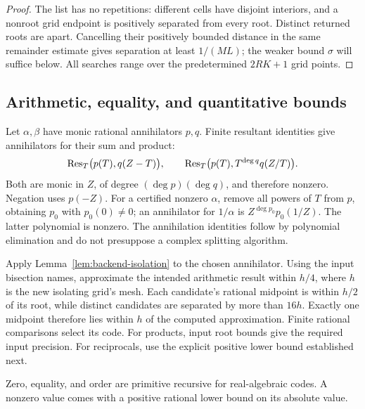 \begin{proof}
The list has no repetitions: different cells have disjoint interiors,
and a nonroot grid endpoint is positively separated from every root.
Distinct returned roots are apart. Cancelling their positively bounded
distance in the same remainder estimate gives separation at least
$1/(ML)$; the weaker bound $\sigma$ will suffice below.
All searches range over the predetermined $2RK+1$ grid points.
\end{proof}

\subsection{Arithmetic, equality, and quantitative bounds}

Let $\alpha,\beta$ have monic rational annihilators $p,q$.
Finite resultant identities give annihilators for their sum and product:
\[
 \operatorname{Res}_T\bigl(p(T),q(Z-T)\bigr),\qquad
 \operatorname{Res}_T\bigl(p(T),T^{\deg q}q(Z/T)\bigr).
\]
Both are monic in $Z$, of degree $(\deg p)(\deg q)$, and therefore nonzero.
Negation uses $p(-Z)$. For a certified nonzero $\alpha$, remove all powers
of $T$ from $p$, obtaining $p_0$ with $p_0(0)\ne0$; an annihilator for
$1/\alpha$ is
$Z^{\deg p_0}p_0(1/Z)$.
The latter polynomial is nonzero. The annihilation identities follow by
polynomial elimination and do not presuppose a complex splitting algorithm.

Apply Lemma~\ref{lem:backend-isolation} to the chosen annihilator.
Using the input bisection names, approximate the intended arithmetic result
within $h/4$, where $h$ is the new isolating grid's mesh.
Each candidate's rational midpoint is within $h/2$ of its root, while
distinct candidates are separated by more than $16h$.
Exactly one midpoint therefore lies within $h$ of the computed
approximation. Finite rational comparisons select its code.
For products, input root bounds give the required input precision.
For reciprocals, use the explicit positive lower bound established next.

\begin{lemma}
\label{lem:backend-zero}
Zero, equality, and order are primitive recursive for real-algebraic codes.
A nonzero value comes with a positive rational lower bound on its absolute
value.
\end{lemma}

